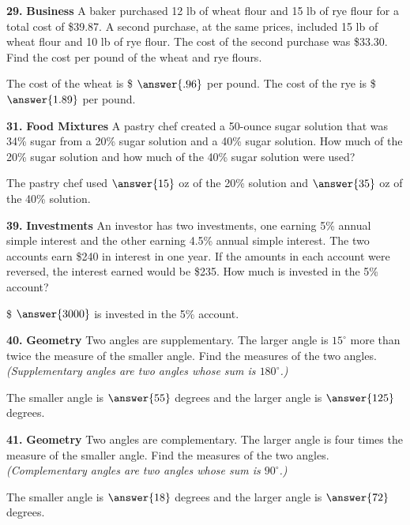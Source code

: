\documentclass{ximera}
\begin{document}
\begin{problem}
\textbf{29.} \textbf{Business} A baker purchased 12 lb of wheat flour and 15 lb of rye flour for
  a total cost of \$39.87. A second purchase, at the same prices, included 15 lb of wheat
  flour and 10 lb of rye flour. The cost of the second purchase was \$33.30. Find the cost
  per pound of the wheat and rye flours.

The cost of the wheat is \$ $\answer{.96}$ per pound. The cost of the rye is \$ $\answer{1.89}$ per pound.
\end{problem}

\begin{problem}
\textbf{31.} \textbf{Food Mixtures} A pastry chef created a 50-ounce sugar solution that was
  34\% sugar from a 20\% sugar solution and a 40\% sugar solution. How much of the 20\%
  sugar solution and how much of the 40\% sugar solution were used?

The pastry chef used $\answer{15}$ oz of the 20\% solution and $\answer{35}$ oz of the 40\% solution.
\end{problem}

\begin{problem}
\textbf{39.} \textbf{Investments} An investor has two investments, one earning 5\% annual simple
  interest and the other earning 4.5\% annual simple interest. The two accounts earn \$240
  in interest in one year. If the amounts in each account were reversed, the interest
  earned would be \$235. How much is invested in the 5\% account?

\$ $\answer{3000}$ is invested in the 5\% account.
\end{problem}

\begin{problem}
\textbf{40.} \textbf{Geometry} Two angles are supplementary. The larger angle is $15^\circ$ more
  than twice the measure of the smaller angle. Find the measures of the two angles.
  \emph{(Supplementary angles are two angles whose sum is $180^\circ$.)}

The smaller angle is $\answer{55}$ degrees and the larger angle is $\answer{125}$ degrees.
\end{problem}

\begin{problem}
\textbf{41.} \textbf{Geometry} Two angles are complementary. The larger angle is four times the
  measure of the smaller angle. Find the measures of the two angles.
  \emph{(Complementary angles are two angles whose sum is $90^\circ$.)}

The smaller angle is $\answer{18}$ degrees and the larger angle is $\answer{72}$ degrees.
\end{problem}
\end{document}
